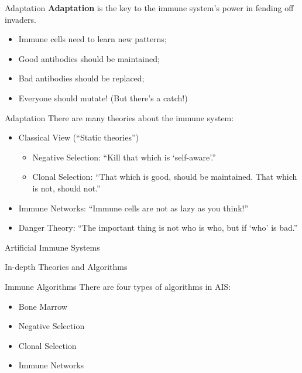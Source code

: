 \documentclass[xcolor=svgnames]{beamer}
\newcommand{\introframe}[2]{
    \begin{frame}
       \vfill
       \hfill\Huge{#1}
       
       \vspace{1em}
       
       \hfill\Large{#2}
       \vfill
    \end{frame}
}
\begin{document}
        \begin{frame}{Adaptation}
            \textbf{Adaptation} is the key to the immune system's power in fending off invaders.
        
            \begin{itemize}
                \item Immune cells need to learn new patterns;
                \item Good antibodies should be maintained;
                \item Bad antibodies should be replaced;
                \item Everyone should mutate! (But there's a catch!)
            \end{itemize}
        \end{frame}
        
        \begin{frame}{Adaptation}
            There are many theories about the immune system:
            
            \begin{itemize}
                \item Classical View (``Static theories'')
                \begin{itemize}
                    \item Negative Selection: ``Kill that which is `self-aware'.''
                    \item Clonal Selection: ``That which is good, should be maintained. That which is not, should not.''
                \end{itemize}
                \pause
                \item Immune Networks: ``Immune cells are not as lazy as you think!''
                \pause
                \item Danger Theory: ``The important thing is not who is who, but if `who' is bad.''
            \end{itemize}
        \end{frame}
            
        \introframe{Artificial Immune Systems}{In-depth Theories and Algorithms}

        \begin{frame}{Immune Algorithms}
            There are four types of algorithms in AIS:

            \begin{itemize}
                \item Bone Marrow
                \item Negative Selection
                \item Clonal Selection
                \item Immune Networks
            \end{itemize}
        \end{frame}
        
\end{document}
